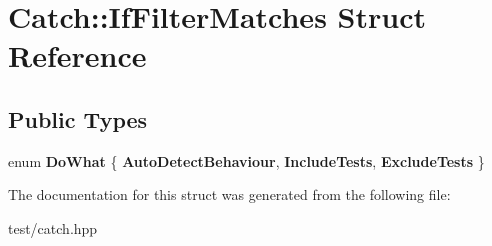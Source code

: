 \hypertarget{structCatch_1_1IfFilterMatches}{}\section{Catch\+:\+:If\+Filter\+Matches Struct Reference}
\label{structCatch_1_1IfFilterMatches}
\subsection*{Public Types}
\begin{DoxyCompactItemize}
\item 
enum {\bfseries Do\+What} \{ {\bfseries Auto\+Detect\+Behaviour}, 
{\bfseries Include\+Tests}, 
{\bfseries Exclude\+Tests}
 \}\hypertarget{structCatch_1_1IfFilterMatches_aa76fce16fd15e10174ed3b3c307d2df4}{}\label{structCatch_1_1IfFilterMatches_aa76fce16fd15e10174ed3b3c307d2df4}

\end{DoxyCompactItemize}


The documentation for this struct was generated from the following file\+:\begin{DoxyCompactItemize}
\item 
test/catch.\+hpp\end{DoxyCompactItemize}
